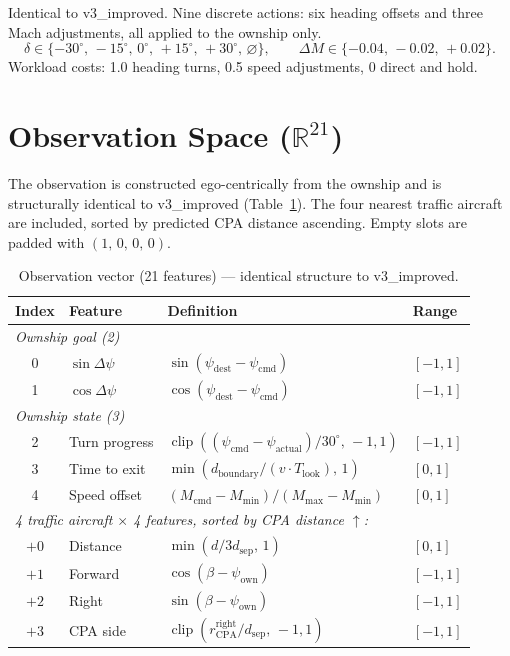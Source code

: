 \documentclass[11pt, a4paper]{article}
\begin{document}
Identical to v3\_improved.
Nine discrete actions: six heading offsets and three Mach adjustments, all
applied to the ownship only.
\begin{equation}
    \delta \in \{-30^\circ,\,-15^\circ,\,0^\circ,\,+15^\circ,\,+30^\circ,\,\varnothing\},
    \qquad
    \Delta M \in \{-0.04,\,-0.02,\,+0.02\}.
\end{equation}
Workload costs: 1.0 heading turns, 0.5 speed adjustments, 0 direct and hold.

\section{Observation Space ($\mathbb{R}^{21}$)}

The observation is constructed ego-centrically from the ownship and is
structurally identical to v3\_improved (Table~\ref{tab:obs}).
The four nearest traffic aircraft are included, sorted by predicted CPA
distance ascending.
Empty slots are padded with $(1,\,0,\,0,\,0)$.

\begin{table}[h]
\centering
\caption{Observation vector (21 features) — identical structure to v3\_improved.}
\label{tab:obs}
\smallskip
\begin{tabular}{clll}
\toprule
\textbf{Index} & \textbf{Feature} & \textbf{Definition} & \textbf{Range} \\
\midrule
\multicolumn{4}{l}{\textit{Ownship goal (2)}} \\[2pt]
0 & $\sin\Delta\psi$ & $\sin(\psi_\text{dest}-\psi_\text{cmd})$ & $[-1,1]$ \\[2pt]
1 & $\cos\Delta\psi$ & $\cos(\psi_\text{dest}-\psi_\text{cmd})$ & $[-1,1]$ \\[4pt]
\multicolumn{4}{l}{\textit{Ownship state (3)}} \\[2pt]
2 & Turn progress
  & $\operatorname{clip}((\psi_\text{cmd}-\psi_\text{actual})/30^\circ,\,-1,1)$
  & $[-1,1]$ \\[2pt]
3 & Time to exit
  & $\min(d_\text{boundary}/(v\cdot T_\text{look}),\,1)$
  & $[0,1]$ \\[2pt]
4 & Speed offset
  & $(M_\text{cmd}-M_\text{min})/(M_\text{max}-M_\text{min})$
  & $[0,1]$ \\[4pt]
\multicolumn{4}{l}{\textit{4 traffic aircraft $\times$ 4 features, sorted by CPA distance $\uparrow$:}} \\[2pt]
$+0$ & Distance  & $\min(d/3d_\text{sep},\,1)$                    & $[0,1]$  \\[2pt]
$+1$ & Forward   & $\cos(\beta-\psi_\text{own})$                   & $[-1,1]$ \\[2pt]
$+2$ & Right     & $\sin(\beta-\psi_\text{own})$                   & $[-1,1]$ \\[2pt]
$+3$ & CPA side  & $\operatorname{clip}(r^\text{right}_\text{CPA}/d_\text{sep},\,-1,1)$ & $[-1,1]$ \\
\bottomrule
\end{tabular}
\end{table}
\end{document}
